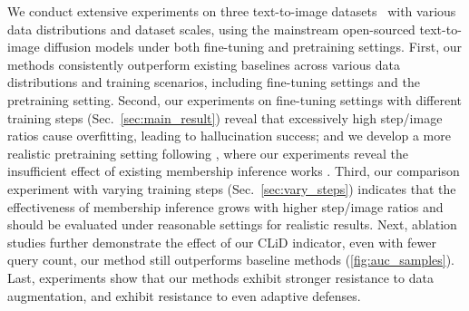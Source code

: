 We conduct extensive experiments on three text-to-image datasets~\cite{lin2014microsoft,young2014image,Pokemon-Blip} with various data distributions and dataset scales, using the mainstream open-sourced text-to-image diffusion models \cite{Stable-Diffusion-v1-4, Stable-Diffusion-v1-5} under both fine-tuning and pretraining settings. 
First, our methods consistently outperform existing baselines across various data distributions and training scenarios, including fine-tuning settings and the pretraining setting. Second, our experiments on fine-tuning settings with different training steps (Sec.~\ref{sec:main_result}) reveal that excessively high step/image ratios cause overfitting, leading to hallucination success; and we develop a more realistic pretraining setting following \cite{dubinski2024towards,das2024blind}, where our experiments reveal the insufficient effect of existing membership inference works \cite{duan2023diffusion, kong2023efficient, fu2023probabilistic, matsumoto2023membership}.
Third, our comparison experiment with varying training steps (Sec.~\ref{sec:vary_steps}) indicates that the effectiveness of membership inference grows with higher step/image ratios and should be evaluated under reasonable settings for realistic results.
Next, ablation studies further demonstrate the effect of our CLiD indicator, even with fewer query count, our method still outperforms baseline methods (\cref{fig:auc_samples}).
Last, experiments show that our methods exhibit stronger resistance to data augmentation, and exhibit resistance to even adaptive defenses. 


